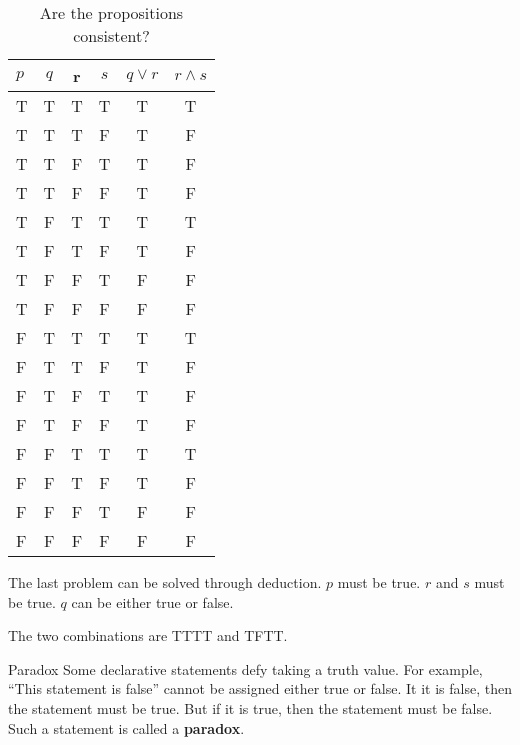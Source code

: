\documentclass [handout]{beamer}
\begin{document}
\begin{frame}
\footnotesize
\begin{table}
\begin{tabular}{l | c | c | c | c | c }
$p$ & $q$ &$ $r & $s$ & $q \lor r$ & $r \land s$ \\
\hline \hline
T & T & T & T & T & T \\ 
T & T & T & F & T & F \\ 
T & T & F & T & T & F \\ 
T & T & F & F & T & F \\ 
T & F & T & T & T & T \\ 
T & F & T & F & T & F \\ 
T & F & F & T & F & F \\ 
T & F & F & F & F & F \\ 
F & T & T & T & T & T \\ 
F & T & T & F & T & F \\ 
F & T & F & T & T & F \\ 
F & T & F & F & T & F \\ 
F & F & T & T & T & T \\ 
F & F & T & F & T & F \\ 
F & F & F & T & F & F \\ 
F & F & F & F & F & F \\ 
\end{tabular}
\caption{Are the propositions consistent?}
\end{table}
\normalfont
\end{frame}

\begin{frame}
The last problem can be solved through deduction.
$p$ must be true.
$r$ and $s$ must be true.
$q$ can be either true or false.

The two combinations are TTTT and TFTT.
\end{frame}

\begin{frame}{Paradox}
Some declarative statements defy taking a truth value. For example, ``This statement is false'' cannot be assigned either true or false. It it is false, then the statement must be true. But if it is true, then the statement must be false. Such a statement is called a \textbf{paradox}.
\end{frame}
\end{document}
